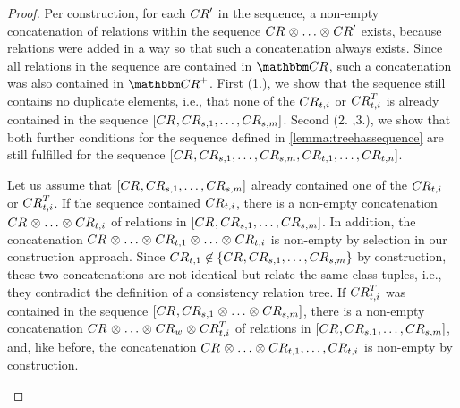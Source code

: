 \begin{proof}
    Per construction, for each $\consistencyrelation{CR}{}'$ in the sequence, a non-empty concatenation of relations within the sequence $\consistencyrelation{CR}{} \concat \dots \concat \consistencyrelation{CR}{}'$ exists, because relations were added in a way so that such a concatenation always exists. Since all relations in the sequence are contained in $\consistencyrelationset{CR}$, such a concatenation was also contained in $\transitiveclosure{\consistencyrelationset{CR}}$.
    First (1.), we show that the sequence still contains no duplicate elements, i.e., that none of the $\consistencyrelation{CR}{t,i}$ or $\consistencyrelation{CR}{t,i}^T$ is already contained in the sequence $\sequenced{\consistencyrelation{CR}{}, \consistencyrelation{CR}{s,1}, \dots, \consistencyrelation{CR}{s,m}}$. 
    Second (2. ,3.), we show that both further conditions for the sequence defined in \autoref{lemma:treehassequence} are still fulfilled for the sequence $\sequenced{\consistencyrelation{CR}{}, \consistencyrelation{CR}{s,1}, \dots, \consistencyrelation{CR}{s,m}, \consistencyrelation{CR}{t,1}, \dots, \consistencyrelation{CR}{t,n}}$.
    \begin{longenumerate}
        \item
    Let us assume that $\sequenced{\consistencyrelation{CR}{}, \consistencyrelation{CR}{s,1}, \dots, \consistencyrelation{CR}{s,m}}$ already contained one of the $\consistencyrelation{CR}{t,i}$ or $\consistencyrelation{CR}{t,i}^T$. If the sequence contained $\consistencyrelation{CR}{t,i}$, there is a non-empty concatenation $\consistencyrelation{CR}{} \concat \dots \concat \consistencyrelation{CR}{t,i}$ of relations in $\sequenced{\consistencyrelation{CR}{}, \consistencyrelation{CR}{s,1}, \dots, \consistencyrelation{CR}{s,m}}$. In addition, the concatenation $\consistencyrelation{CR}{} \concat \dots \concat \consistencyrelation{CR}{t,1} \concat \dots \concat \consistencyrelation{CR}{t,i}$ is non-empty by selection in our construction approach.
    Since $\consistencyrelation{CR}{t,1} \not\in \setted{\consistencyrelation{CR}{}, \consistencyrelation{CR}{s,1}, \dots, \consistencyrelation{CR}{s,m}}$ by construction, these two concatenations are not identical but relate the same class tuples, i.e., they contradict the definition of a consistency relation tree.
    If $\consistencyrelation{CR}{t,i}^T$ was contained in the sequence $\sequenced{\consistencyrelation{CR}{}, \consistencyrelation{CR}{s,1} \concat \dots \concat \consistencyrelation{CR}{s,m}}$, there is a non-empty concatenation $\consistencyrelation{CR}{} \concat \dots \concat \consistencyrelation{CR}{w} \concat \consistencyrelation{CR}{t,i}^T$ of relations in $\sequenced{\consistencyrelation{CR}{}, \consistencyrelation{CR}{s,1}, \dots, \consistencyrelation{CR}{s,m}}$, and, like before, the concatenation $\consistencyrelation{CR}{} \concat \dots \concat \consistencyrelation{CR}{t,1}, \dots, \consistencyrelation{CR}{t,i}$ is non-empty by construction.

\end{longenumerate}
\end{proof}
